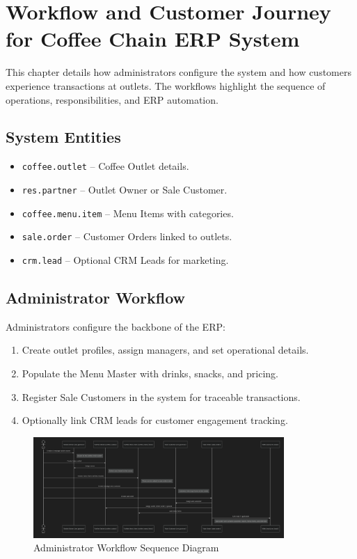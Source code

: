 \chapter{Workflow and Customer Journey for Coffee Chain ERP System}

This chapter details how administrators configure the system and how customers experience transactions at outlets. The workflows highlight the sequence of operations, responsibilities, and ERP automation.

\section*{System Entities}
\begin{itemize}
    \item \texttt{coffee.outlet} – Coffee Outlet details.  
    \item \texttt{res.partner} – Outlet Owner or Sale Customer.  
    \item \texttt{coffee.menu.item} – Menu Items with categories.  
    \item \texttt{sale.order} – Customer Orders linked to outlets.  
    \item \texttt{crm.lead} – Optional CRM Leads for marketing.  
\end{itemize}

\section*{Administrator Workflow}
Administrators configure the backbone of the ERP:
\begin{enumerate}
    \item Create outlet profiles, assign managers, and set operational details.  
    \item Populate the Menu Master with drinks, snacks, and pricing.  
    \item Register Sale Customers in the system for traceable transactions.  
    \item Optionally link CRM leads for customer engagement tracking.  
\end{enumerate}

\begin{figure}[H]
    \centering
    \includegraphics[width=0.85\textwidth]{diagrams/sequence.png}
    \caption{Administrator Workflow Sequence Diagram}
\end{figure}

